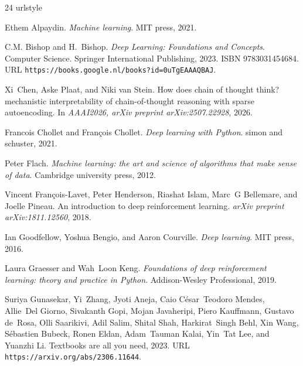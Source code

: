 \begin{thebibliography}{24}
\providecommand{\natexlab}[1]{#1}
\providecommand{\url}[1]{\texttt{#1}}
\expandafter\ifx\csname urlstyle\endcsname\relax
  \providecommand{\doi}[1]{doi: #1}\else
  \providecommand{\doi}{doi: \begingroup \urlstyle{rm}\Url}\fi

Ethem Alpaydin.
\newblock \emph{Machine learning}.
\newblock MIT press, 2021.

C.M. Bishop and H.~Bishop.
\newblock \emph{Deep Learning: Foundations and Concepts}.
\newblock Computer Science. Springer International Publishing, 2023.
\newblock ISBN 9783031454684.
\newblock URL \url{https://books.google.nl/books?id=0uTgEAAAQBAJ}.

Xi~Chen, Aske Plaat, and Niki van Stein.
\newblock How does chain of thought think? mechanistic interpretability of chain-of-thought reasoning with sparse autoencoding.
\newblock In \emph{AAAI2026, arXiv preprint arXiv:2507.22928}, 2026.

Francois Chollet and Fran{\c{c}}ois Chollet.
\newblock \emph{Deep learning with Python}.
\newblock simon and schuster, 2021.

Peter Flach.
\newblock \emph{Machine learning: the art and science of algorithms that make sense of data}.
\newblock Cambridge university press, 2012.

Vincent Fran{\c{c}}ois-Lavet, Peter Henderson, Riashat Islam, Marc~G Bellemare, and Joelle Pineau.
\newblock An introduction to deep reinforcement learning.
\newblock \emph{arXiv preprint arXiv:1811.12560}, 2018.

Ian Goodfellow, Yoshua Bengio, and Aaron Courville.
\newblock \emph{Deep learning}.
\newblock MIT press, 2016.

Laura Graesser and Wah~Loon Keng.
\newblock \emph{Foundations of deep reinforcement learning: theory and practice in Python}.
\newblock Addison-Wesley Professional, 2019.

Suriya Gunasekar, Yi~Zhang, Jyoti Aneja, Caio César~Teodoro Mendes, Allie~Del Giorno, Sivakanth Gopi, Mojan Javaheripi, Piero Kauffmann, Gustavo de~Rosa, Olli Saarikivi, Adil Salim, Shital Shah, Harkirat~Singh Behl, Xin Wang, Sébastien Bubeck, Ronen Eldan, Adam~Tauman Kalai, Yin~Tat Lee, and Yuanzhi Li.
\newblock Textbooks are all you need, 2023.
\newblock URL \url{https://arxiv.org/abs/2306.11644}.


\end{thebibliography}
